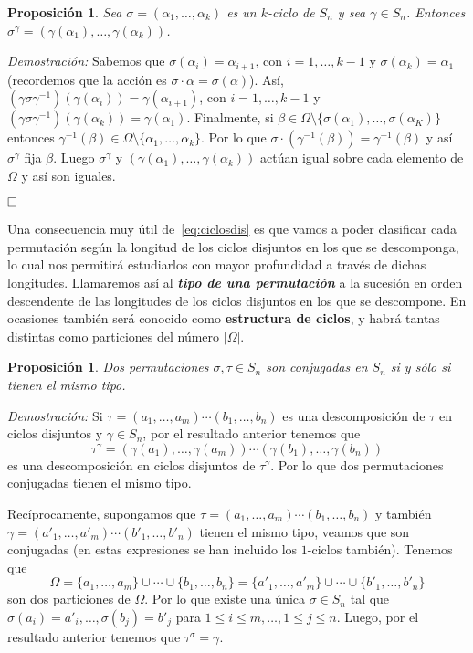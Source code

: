 \documentclass[12pt]{article}
\newtheorem{proposition}[theorem]{Proposición}
\begin{document}
\begin{proposition}Sea $\sigma = (\alpha_1, \ldots, \alpha_k)$ es un $k$-ciclo de $S_n$ y sea $\gamma \in S_n$. Entonces $\sigma^\gamma = (\gamma(\alpha_1), \ldots, \gamma(\alpha_k))$.
\end{proposition}
\emph{Demostración: }Sabemos que $\sigma(\alpha_i) = \alpha_{i+1}$, con $i=1, \ldots, k-1$ y $\sigma(\alpha_k)= \alpha_1$ (recordemos que la acción es $\sigma \cdot \alpha = \sigma(\alpha)$). Así, $(\gamma \sigma \gamma^{-1}) (\gamma(\alpha_i)) = \gamma(\alpha_{i+1})$, con $i=1, \ldots, k-1$ y $(\gamma \sigma \gamma^{-1}) (\gamma(\alpha_k)) = \gamma(\alpha_{1})$. Finalmente, si $\beta \in \Omega \setminus \lbrace \sigma(\alpha_1), \ldots, \sigma(\alpha_K) \rbrace$ entonces $\gamma^{-1}(\beta) \in \Omega \setminus \lbrace \alpha_1, \ldots, \alpha_k \rbrace$. Por lo que $\sigma \cdot (\gamma^{-1} (\beta)) = \gamma^{-1}(\beta)$ y así $\sigma^\gamma$ fija $\beta$. Luego $\sigma^\gamma$ y $(\gamma(\alpha_1), \ldots, \gamma(\alpha_k))$ actúan igual sobre cada elemento de $\Omega$ y así son iguales.

$\hfill \square$

Una consecuencia muy útil de~\ref{eq:ciclosdis} es que vamos a poder clasificar cada permutación según la longitud de los ciclos disjuntos en los que se descomponga, lo cual nos permitirá estudiarlos con mayor profundidad a través de dichas longitudes. Llamaremos así al \textbf{\textit{tipo de una permutación}} a la sucesión en orden descendente de las longitudes de los ciclos disjuntos en los que se descompone. En ocasiones también será conocido como \textbf{estructura de ciclos}, y habrá tantas distintas como particiones del número $|\Omega|$.

\begin{proposition}Dos permutaciones $\sigma, \tau \in S_{n}$ son conjugadas en $S_{n}$ si y sólo si tienen el mismo tipo.
\end{proposition}
\emph{Demostración: }
Si $\tau =(a_{1}, \ldots, a_{m})\cdots(b_{1}, \ldots, b_{n})$ es una descomposición de $\tau$ en ciclos disjuntos y $\gamma \in S_{n}$, por el resultado anterior tenemos que $$\tau^{\gamma}=(\gamma(a_{1}), \ldots, \gamma(a_{m})) \cdots (\gamma(b_{1}), \ldots, \gamma(b_{n}))$$ es una descomposición en ciclos disjuntos de $\tau^{\gamma}$. Por lo que dos permutaciones conjugadas tienen el mismo tipo.

Recíprocamente, supongamos que $\tau =(a_{1}, \ldots, a_{m}) \cdots(b_{1}, \ldots, b_{n})$ y también $\gamma = (a'_{1}, \ldots, a'_{m})\cdots(b'_{1}, \ldots, b'_{n})$ tienen el mismo tipo, veamos que son conjugadas (en estas expresiones se han incluido los $1$-ciclos también). Tenemos que $$\Omega = \lbrace a_{1}, \ldots, a_{m} \rbrace \cup \cdots \cup \lbrace b_{1}, \ldots, b_{n} \rbrace = \lbrace a'_{1}, \ldots, a'_{m} \rbrace \cup \cdots \cup \lbrace b'_{1}, \ldots, b'_{n} \rbrace$$
son dos particiones de $\Omega$. Por lo que existe una única $\sigma \in S_{n}$ tal que $\sigma(a_{i})=a'_{i}, \ldots, \sigma(b_{j})=b'_{j}$ para $1\leq i \leq m, \ldots, 1 \leq j \leq n$. Luego, por el resultado anterior tenemos que $\tau^{\sigma} = \gamma.$
\end{document}
